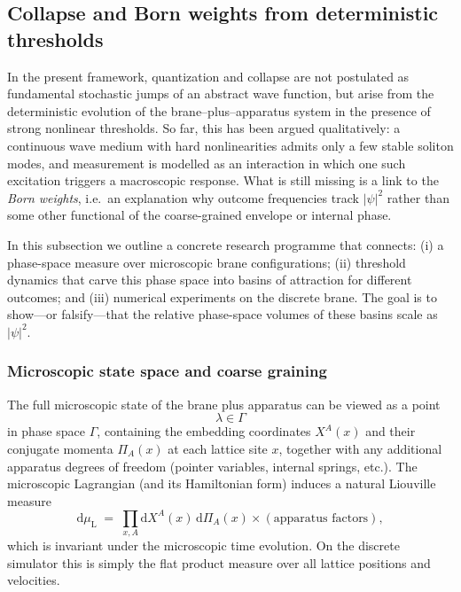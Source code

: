 \subsection{Collapse and Born weights from deterministic thresholds}
\label{sec:born-thresholds}

In the present framework, quantization and collapse are not postulated as fundamental stochastic jumps of an abstract wave function, but arise from the deterministic evolution of the brane--plus--apparatus system in the presence of strong nonlinear thresholds.
So far, this has been argued qualitatively: a continuous wave medium with hard nonlinearities admits only a few stable soliton modes, and measurement is modelled as an interaction in which one such excitation triggers a macroscopic response.
What is still missing is a link to the \emph{Born weights}, i.e.\ an explanation why outcome frequencies track $|\psi|^2$ rather than some other functional of the coarse-grained envelope or internal phase.

In this subsection we outline a concrete research programme that connects:
(i) a phase-space measure over microscopic brane configurations;
(ii) threshold dynamics that carve this phase space into basins of attraction for different outcomes; and
(iii) numerical experiments on the discrete brane.
The goal is to show---or falsify---that the relative phase-space volumes of these basins scale as $|\psi|^2$.

\subsubsection{Microscopic state space and coarse graining}

The full microscopic state of the brane plus apparatus can be viewed as a point
\begin{equation}
  \lambda \in \Gamma
\end{equation}
in phase space $\Gamma$, containing the embedding coordinates $X^A(x)$ and their conjugate momenta $\Pi_A(x)$ at each lattice site $x$, together with any additional apparatus degrees of freedom (pointer variables, internal springs, etc.).
The microscopic Lagrangian (and its Hamiltonian form) induces a natural Liouville measure
\begin{equation}
  \mathrm{d}\mu_{\mathrm{L}} \;=\;
  \prod_{x,A} \mathrm{d}X^A(x)\, \mathrm{d}\Pi_A(x) \times
  (\text{apparatus factors}),
\end{equation}
which is invariant under the microscopic time evolution.
On the discrete simulator this is simply the flat product measure over all lattice positions and velocities.


